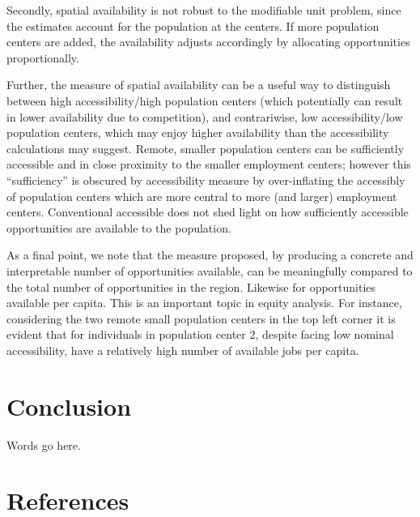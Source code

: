 \documentclass[]{elsarticle} %
\begin{document}
Secondly, spatial availability is not robust to the modifiable unit
problem, since the estimates account for the population at the centers.
If more population centers are added, the availability adjusts
accordingly by allocating opportunities proportionally.

Further, the measure of spatial availability can be a useful way to
distinguish between high accessibility/high population centers (which
potentially can result in lower availability due to competition), and
contrariwise, low accessibility/low population centers, which may enjoy
higher availability than the accessibility calculations may suggest.
Remote, smaller population centers can be sufficiently accessible and in
close proximity to the smaller employment centers; however this
``sufficiency'' is obscured by accessibility measure by over-inflating
the accessibly of population centers which are more central to more (and
larger) employment centers. Conventional accessible does not shed light
on how sufficiently accessible opportunities are available to the
population.

As a final point, we note that the measure proposed, by producing a
concrete and interpretable number of opportunities available, can be
meaningfully compared to the total number of opportunities in the
region. Likewise for opportunities available per capita. This is an
important topic in equity analysis. For instance, considering the two
remote small population centers in the top left corner it is evident
that for individuals in population center 2, despite facing low nominal
accessibility, have a relatively high number of available jobs per
capita.

\hypertarget{conclusion}{%
\section{Conclusion}\label{conclusion}}

Words go here.

\hypertarget{references}{%
\section*{References}\label{references}}
\end{document}
